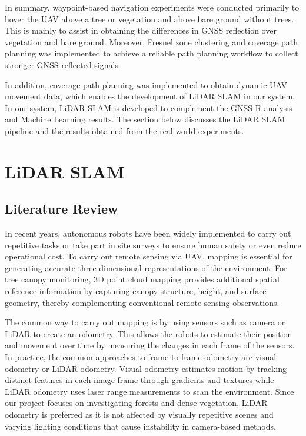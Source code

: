 \documentclass[12pt, a4paper]{article}
\begin{document}
In summary, waypoint-based navigation experiments were conducted primarily to
hover the UAV above a tree or vegetation and above bare ground without trees.
This is mainly to assist in obtaining the differences in GNSS reflection over
vegetation and bare ground. Moreover, Fresnel zone clustering and coverage
path planning was implemented to achieve a reliable path planning workflow to
collect stronger GNSS reflected signals

In addition, coverage path planning was implemented to obtain dynamic UAV
movement data, which enables the development of LiDAR SLAM in our system. In our
system, LiDAR SLAM is developed to complement the GNSS-R analysis and Machine
Learning results. The section below discusses the LiDAR SLAM pipeline and the
results obtained from the real-world experiments.


\section{LiDAR SLAM}

\subsection{Literature Review}
In recent years, autonomous robots have been widely implemented to carry out
repetitive tasks or take part in site surveys to ensure human safety or even
reduce operational cost. To carry out remote sensing via UAV, mapping is
essential for generating accurate three-dimensional representations of the environment. For tree canopy monitoring, 3D point cloud mapping provides additional spatial reference information by capturing canopy structure, height, and surface geometry, thereby complementing conventional remote sensing observations.

The common way to carry out mapping is by using sensors such as camera or LiDAR to create an odometry. This allows the robots to estimate their position and movement over time by measuring the changes in each
frame of the sensors. In practice, the common approaches to frame-to-frame
odometry are visual odometry or LiDAR odometry. Visual odometry estimates motion
by tracking distinct features in each image frame through gradients and textures
while LiDAR odometry uses laser range measurements to scan the environment.
Since our project focuses on investigating forests and dense vegetation, LiDAR
odometry is preferred as it is not affected by visually repetitive scenes and
varying lighting conditions that cause instability in camera-based methods. 
\end{document}
